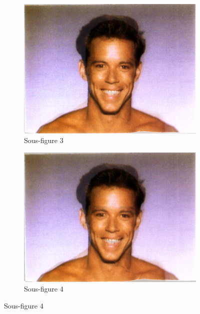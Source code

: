 \begin{figure}[h!]
    \begin{subfigure}{0.45\textwidth}
        \includegraphics[width=\textwidth]{img/testvisuel/frame2.png}
        \caption{Sous-figure 3}
    \end{subfigure}
    \hfill
    \begin{subfigure}{0.45\textwidth}
        \includegraphics[width=\textwidth]{img/testvisuel/frame3.png}
        \caption{Sous-figure 4}
    \end{subfigure}
\end{figure}

